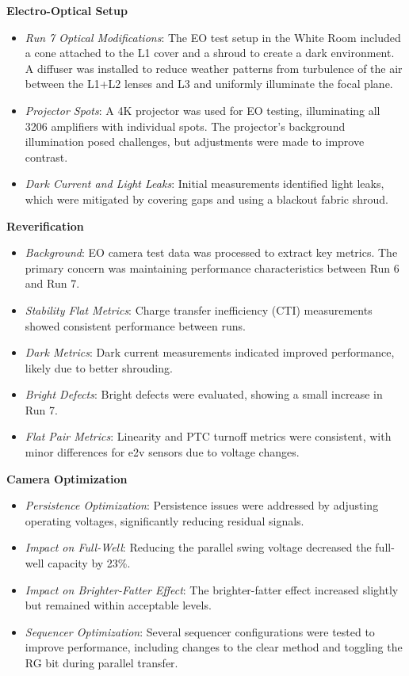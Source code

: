 \textbf{Electro-Optical Setup} \\
\begin{itemize}
    \item \textit{Run 7 Optical Modifications}: The EO test setup in the White Room included a cone attached to the L1 cover and a shroud to create a dark environment. A diffuser was installed to reduce weather patterns from turbulence of the air between the L1+L2 lenses and L3 and uniformly illuminate the focal plane.
    \item \textit{Projector Spots}: A 4K projector was used for EO testing, illuminating all 3206 amplifiers with individual spots. The projector's background illumination posed challenges, but adjustments were made to improve contrast.
    \item \textit{Dark Current and Light Leaks}: Initial measurements identified light leaks, which were mitigated by covering gaps and using a blackout fabric shroud.
\end{itemize}

\textbf{Reverification} \\
\begin{itemize}
    \item \textit{Background}: EO camera test data was processed to extract key metrics. The primary concern was maintaining performance characteristics between Run 6 and Run 7.
    \item \textit{Stability Flat Metrics}: Charge transfer inefficiency (CTI) measurements showed consistent performance between runs.
    \item \textit{Dark Metrics}: Dark current measurements indicated improved performance, likely due to better shrouding.
    \item \textit{Bright Defects}: Bright defects were evaluated, showing a small increase in Run 7.
    \item \textit{Flat Pair Metrics}: Linearity and PTC turnoff metrics were consistent, with minor differences for e2v sensors due to voltage changes.
\end{itemize}

\textbf{Camera Optimization} \\
\begin{itemize}
    \item \textit{Persistence Optimization}: Persistence issues were addressed by adjusting operating voltages, significantly reducing residual signals.
    \item \textit{Impact on Full-Well}: Reducing the parallel swing voltage decreased the full-well capacity by 23\%.
    \item \textit{Impact on Brighter-Fatter Effect}: The brighter-fatter effect increased slightly but remained within acceptable levels.
    \item \textit{Sequencer Optimization}: Several sequencer configurations were tested to improve performance, including changes to the clear method and toggling the RG bit during parallel transfer.
\end{itemize}

